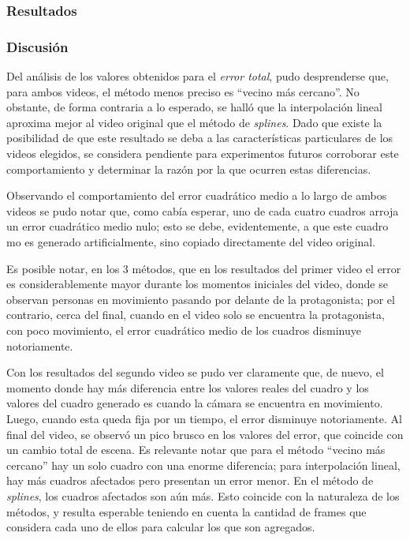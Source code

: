         \subsubsection*{Resultados}


        \subsubsection*{Discusión}

            Del análisis de los valores obtenidos para el \emph{error total}, pudo desprenderse que, para ambos videos, el método menos preciso es ``vecino más cercano''. No obstante, de forma contraria a lo esperado, se halló que la interpolación lineal aproxima mejor al video original que el método de \emph{splines}. Dado que existe la posibilidad de que este resultado se deba a las características particulares de los videos elegidos, se considera pendiente para experimentos futuros corroborar este comportamiento y determinar la razón por la que ocurren estas diferencias.

            Observando el comportamiento del error cuadrático medio a lo largo de ambos videos se pudo notar que, como cabía esperar, uno de cada cuatro cuadros arroja un error cuadrático medio nulo; esto se debe, evidentemente, a que este cuadro mo es generado artificialmente, sino copiado directamente del video original.

            Es posible notar, en los 3 métodos, que en los resultados del primer video el error es considerablemente mayor durante los momentos iniciales del video, donde se observan personas en movimiento pasando por delante de la protagonista; por el contrario, cerca del final, cuando en el video solo se encuentra la protagonista, con poco movimiento, el error cuadrático medio de los cuadros disminuye notoriamente.

            Con los resultados del segundo video se pudo ver claramente que, de nuevo, el momento donde hay más diferencia entre los valores reales del cuadro y los valores del cuadro generado es cuando la cámara se encuentra en movimiento. Luego, cuando esta queda fija por un tiempo, el error disminuye notoriamente. Al final del video, se observó un pico brusco en los valores del error, que coincide con un cambio total de escena. Es relevante notar que para el método ``vecino más cercano'' hay un solo cuadro con una enorme diferencia; para interpolación lineal, hay más cuadros afectados pero presentan un error menor. En el método de \emph{splines}, los cuadros afectados son aún más. Esto coincide con la naturaleza de los métodos, y resulta esperable teniendo en cuenta la cantidad de frames que considera cada uno de ellos para calcular los que son agregados.

